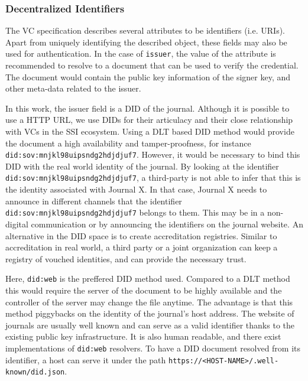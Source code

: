 \subsubsection{Decentralized Identifiers}

The \acrshort{VC} specification describes several attributes to be identifiers (i.e. \acrshort{URI}s). Apart from uniquely identifying the described object, these fields may also be used for authentication. In the case of \lstinline{issuer}, the value of the attribute is recommended to resolve to a document that can be used to verify the credential. The document would contain the public key information of the signer key, and other meta-data related to the issuer.

In this work, the issuer field is a \acrshort{DID} of the journal. Although it is possible to use a \acrshort{HTTP} \acrshort{URL}, we use \acrshort{DID}s for their articulacy and their close relationship with \acrshort{VC}s in the \acrshort{SSI} ecosystem. Using a \acrshort{DLT} based \acrshort{DID} method would provide the document a high availability and tamper-proofness, for instance \lstinline{did:sov:mnjkl98uipsndg2hdjdjuf7}. However, it would be necessary to bind this \acrshort{DID} with the real world identity of the journal. By looking at the identifier \lstinline{did:sov:mnjkl98uipsndg2hdjdjuf7}, a third-party is not able to infer that this is the identity associated with Journal X. In that case, Journal X needs to announce in different channels that the identifier \lstinline{did:sov:mnjkl98uipsndg2hdjdjuf7} belongs to them. This may be in a non-digital communication or by announcing the identifiers on the journal website. An alternative in the \acrshort{DID} space is to create accreditation registries. Similar to accreditation in real world, a third party or a joint organization can keep a registry of vouched identities, and can provide the necessary trust.

Here, \lstinline{did:web} is the preffered \acrshort{DID} method used. Compared to a \acrshort{DLT} method this would require the server of the document to be highly available and the controller of the server may change the file anytime. The advantage is that this method piggybacks on the identity of the journal's host address. The website of journals are usually well known and can serve as a valid identifier thanks to the existing public key infrastructure. It is also human readable, and there exist implementations of \lstinline{did:web} resolvers. To have a \acrshort{DID} document resolved from its identifier, a host can serve it under the path \lstinline{https://<HOST-NAME>/.well-known/did.json}. 

